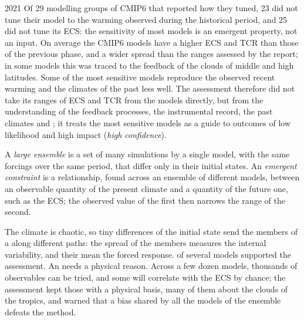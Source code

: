 \begin{dated}{2021}
Of 29 modelling groups of CMIP6 that reported how they tuned, 23 did not
tune their model to the warming observed during the historical period, and
25 did not tune its ECS: the sensitivity of most models is an emergent
property, not an input. On average the CMIP6 models have a higher ECS and
TCR than those of the previous phase, and a wider spread than the ranges
assessed by the report; in some models this was traced to the feedback of
the clouds of middle and high latitudes. Some of the most sensitive models
reproduce the observed recent warming and the climates of the past less
well. The assessment therefore did not take its ranges of ECS and TCR from
the models directly, but from the understanding of the feedback processes,
the instrumental record, the past climates and ; it treats the most sensitive models as a guide to
outcomes of low likelihood and high impact (\emph{high confidence}).
\end{dated}

\begin{definition}\label{def:b3:climate-models:evaluation}
A \emph{large ensemble} is a set of many simulations
by a single model, with the same forcings over the same period, that differ
only in their initial states. An \emph{emergent
constraint} is a relationship, found across an
ensemble of different models, between an observable quantity of the
present climate and a quantity of the future one, such as the ECS; the
observed value of the first then narrows the range of the second.
\end{definition}

The climate is chaotic, so tiny differences of the initial state send the
members of a  along different paths: the spread of the
members measures the internal variability, and their mean the forced
response.  of several models supported the assessment. An
 needs a physical reason. Across a few dozen models,
thousands of observables can be tried, and some will correlate with the
ECS by chance; the assessment kept those with a physical basis, many of
them about the clouds of the tropics, and warned that a bias shared by all
the models of the ensemble defeats the method.


